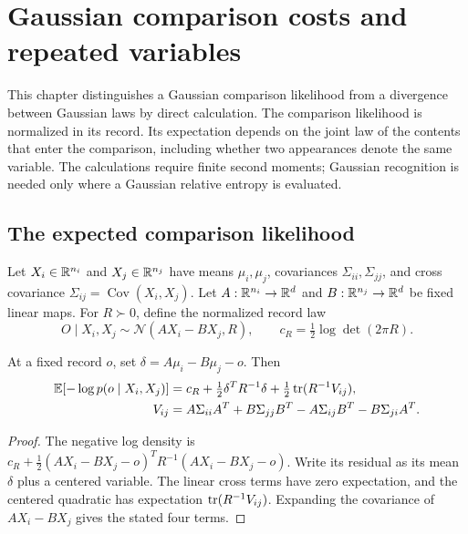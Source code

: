 \chapter{Gaussian comparison costs and repeated variables}
\label{ch:sup-variation}

This chapter distinguishes a Gaussian comparison likelihood from a divergence between Gaussian laws by direct calculation. The comparison likelihood is normalized in its record. Its expectation depends on the joint law of the contents that enter the comparison, including whether two appearances denote the same variable. The calculations require finite second moments; Gaussian recognition is needed only where a Gaussian relative entropy is evaluated.

\section{The expected comparison likelihood}

Let $X_i\in\mathbb R^{n_i}$ and $X_j\in\mathbb R^{n_j}$ have means $\mu_i,\mu_j$, covariances $\Sigma_{ii},\Sigma_{jj}$, and cross covariance $\Sigma_{ij}=\operatorname{Cov}(X_i,X_j)$. Let $A:\mathbb R^{n_i}\to\mathbb R^d$ and $B:\mathbb R^{n_j}\to\mathbb R^d$ be fixed linear maps. For $R\succ0$, define the normalized record law
\begin{equation}
 O\mid X_i,X_j\sim\mathcal N(AX_i-BX_j,R),
 \qquad c_R=\tfrac12\log\det(2\pi R).
 \label{eq:sup-comparison-law}
\end{equation}

At a fixed record $o$, set $\delta=A\mu_i-B\mu_j-o$. Then
\begin{equation}
 \begin{aligned}
 \mathbb E[-\log p(o\mid X_i,X_j)]
 &=c_R+\tfrac12\delta^TR^{-1}\delta
       +\tfrac12\operatorname{tr}(R^{-1}V_{ij}),\\
 V_{ij}&=A\Sigma_{ii}A^T+B\Sigma_{jj}B^T
         -A\Sigma_{ij}B^T-B\Sigma_{ji}A^T.
 \end{aligned}
 \label{eq:sup-residual-cost}
\end{equation}
\begin{proof}
The negative log density is $c_R+\tfrac12(AX_i-BX_j-o)^TR^{-1}(AX_i-BX_j-o)$. Write its residual as its mean $\delta$ plus a centered variable. The linear cross terms have zero expectation, and the centered quadratic has expectation $\operatorname{tr}(R^{-1}V_{ij})$. Expanding the covariance of $AX_i-BX_j$ gives the stated four terms.
\end{proof}


